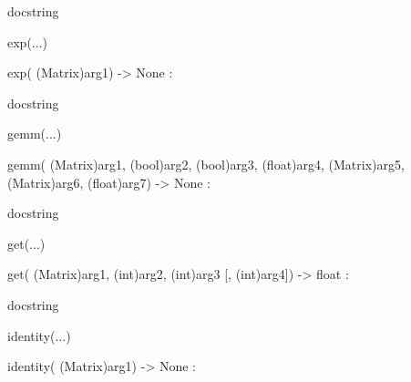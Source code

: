 \documentclass[letterpaper,10pt,english]{sphinxmanual}
\begin{document}
\begin{description}
\begin{description}
\begin{DUlineblock}{0em}
\begin{DUlineblock}{\DUlineblockindent}
\item[]
\begin{DUlineblock}{\DUlineblockindent}
\item[] docstring
\item[] 
\end{DUlineblock}
\end{DUlineblock}
\item[] exp(...)
\item[]
\begin{DUlineblock}{\DUlineblockindent}
\item[] exp( (Matrix)arg1) -\textgreater{} None :
\item[]
\begin{DUlineblock}{\DUlineblockindent}
\item[] docstring
\item[] 
\end{DUlineblock}
\end{DUlineblock}
\item[] gemm(...)
\item[]
\begin{DUlineblock}{\DUlineblockindent}
\item[] gemm( (Matrix)arg1, (bool)arg2, (bool)arg3, (float)arg4, (Matrix)arg5, (Matrix)arg6, (float)arg7) -\textgreater{} None :
\item[]
\begin{DUlineblock}{\DUlineblockindent}
\item[] docstring
\item[] 
\end{DUlineblock}
\end{DUlineblock}
\item[] get(...)
\item[]
\begin{DUlineblock}{\DUlineblockindent}
\item[] get( (Matrix)arg1, (int)arg2, (int)arg3 {[}, (int)arg4{]}) -\textgreater{} float :
\item[]
\begin{DUlineblock}{\DUlineblockindent}
\item[] docstring
\item[] 
\end{DUlineblock}
\end{DUlineblock}
\item[] identity(...)
\item[]
\begin{DUlineblock}{\DUlineblockindent}
\item[] identity( (Matrix)arg1) -\textgreater{} None :

\end{DUlineblock}
\end{DUlineblock}
\end{description}
\end{description}
\end{document}
